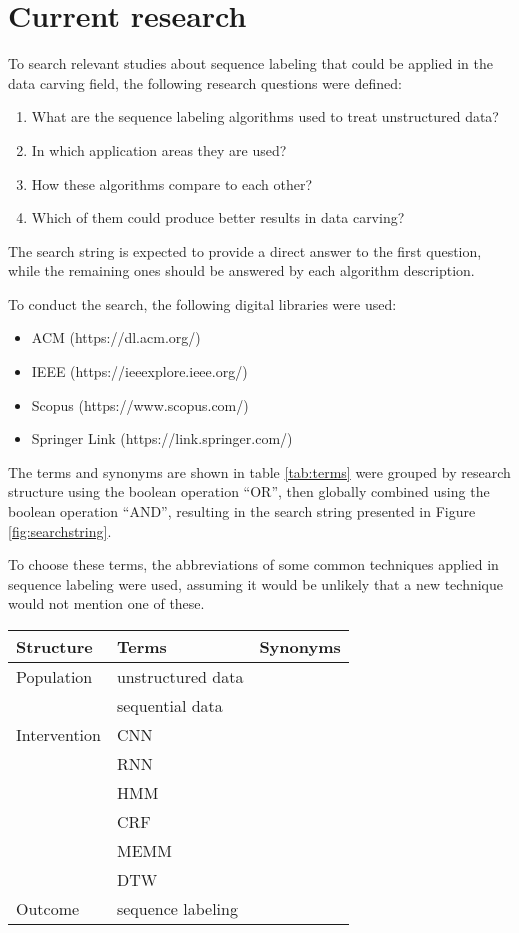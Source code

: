 \section{Current research}
To search relevant studies about sequence labeling that could be applied in the data carving field, the following research questions were defined:

\begin{enumerate}
\item   What are the sequence labeling algorithms used to treat unstructured data?
\item   In which application areas they are used?
\item   How these algorithms compare to each other?
\item   Which of them could produce better results in data carving?
\end{enumerate}

The search string is expected to provide a direct answer to the first question, while the remaining ones should be answered by each algorithm description.

To conduct the search, the following digital libraries were used: 
\begin{itemize}
\item{ACM} (https://dl.acm.org/)
\item IEEE (https://ieeexplore.ieee.org/)
\item Scopus (https://www.scopus.com/) 
\item Springer Link (https://link.springer.com/)
\end{itemize}

The terms and synonyms are shown in table \ref{tab:terms} were grouped by research structure using the boolean operation “OR”, then globally combined using the boolean operation “AND”, resulting in the search string presented in  Figure \ref{fig:searchstring}.

To choose these terms, the abbreviations of some common techniques applied in sequence labeling were used, assuming it would be unlikely that a new technique would not mention one of these.

\begin{table*}[!ht]
    \centering
    \begin{tabular}{ l  l  l }
      Structure 	& Terms 		& Synonyms \\
      \hline\hline
      Population 	& unstructured data & \\   
                    & sequential data & \\
      \hline
      Intervention 	& CNN & \\
                    & RNN & \\
                    & HMM & \\
                    & CRF & \\
                    & MEMM & \\
                    & DTW & \\
      \hline
      Outcome 		& sequence labeling &\\
      \hline
    \end{tabular}
    \caption{Terms and synonyms}
    \label{tab:terms}
\end{table*}

